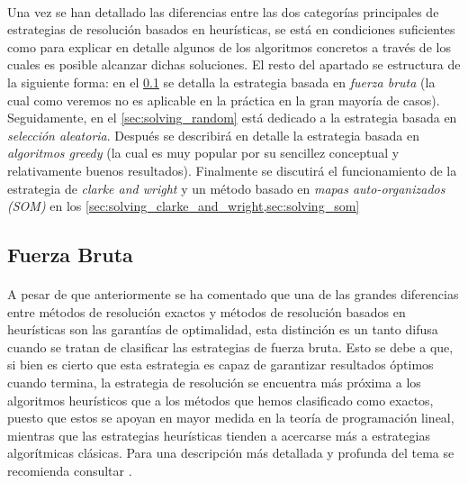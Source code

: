 \documentclass{subfiles}
\begin{document}
      \paragraph{}
      Una vez se han detallado las diferencias entre las dos categorías principales de estrategias de resolución basados en heurísticas, se está en condiciones suficientes como para explicar en detalle algunos de los algoritmos concretos a través de los cuales es posible alcanzar dichas soluciones. El resto del apartado se estructura de la siguiente forma: en el \cref{sec:solving_brute_force} se detalla la estrategia basada en \emph{fuerza bruta} (la cual como veremos no es aplicable en la práctica en la gran mayoría de casos). Seguidamente, en el \cref{sec:solving_random} está dedicado a la estrategia basada en \emph{selección aleatoria}. Después se describirá en detalle la estrategia basada en \emph{algoritmos greedy} (la cual es muy popular por su sencillez conceptual y relativamente buenos resultados). Finalmente se discutirá el funcionamiento de la estrategia de \emph{clarke and wright} y un método basado en \emph{mapas auto-organizados (SOM)} en los \cref{sec:solving_clarke_and_wright,sec:solving_som} 

      \subsection{Fuerza Bruta}
      \label{sec:solving_brute_force}
        
        \paragraph{}
        A pesar de que anteriormente se ha comentado que una de las grandes diferencias entre métodos de resolución exactos y métodos de resolución basados en heurísticas son las garantías de optimalidad, esta distinción es un tanto difusa cuando se tratan de clasificar las estrategias de fuerza bruta. Esto se debe a que, si bien es cierto que esta estrategia es capaz de garantizar resultados óptimos cuando termina, la estrategia de resolución se encuentra más próxima a los algoritmos heurísticos que a los métodos que hemos clasificado como exactos, puesto que estos se apoyan en mayor medida en la teoría de programación lineal, mientras que las estrategias heurísticas tienden a acercarse más a estrategias algorítmicas clásicas. Para una descripción más detallada y profunda del tema se recomienda consultar \cite{cormen2009introduction}.
\end{document}

